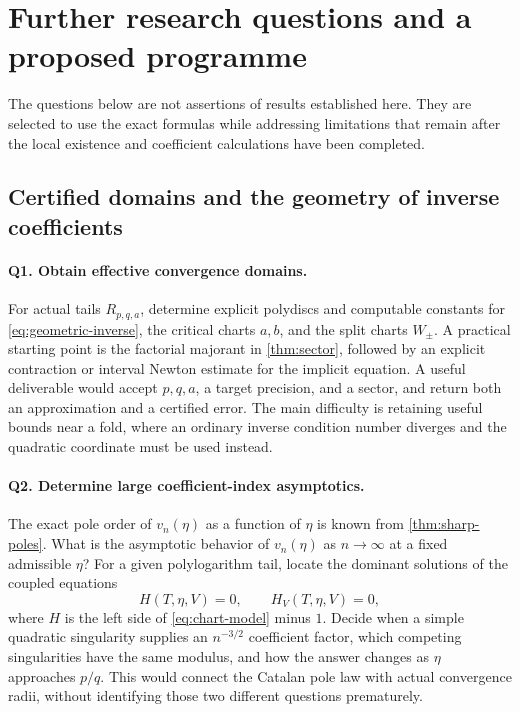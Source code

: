 \documentclass[11pt,a4paper]{article}
\numberwithin{equation}{section}
\theoremstyle{definition}
\theoremstyle{remark}
\begin{document}
\section{Further research questions and a proposed programme}
\label{sec:questions}

The questions below are not assertions of results established here.
They are selected to use the exact formulas while addressing
limitations that remain after the local existence and coefficient
calculations have been completed.

\subsection{Certified domains and the geometry of inverse coefficients}

\paragraph{Q1. Obtain effective convergence domains.}
For actual tails $R_{p,q,a}$, determine explicit polydiscs and
computable constants for \eqref{eq:geometric-inverse}, the critical
charts $a,b$, and the split charts $W_\pm$. A practical starting
point is the factorial majorant in \cref{thm:sector}, followed by
an explicit contraction or interval Newton estimate for the
implicit equation. A useful deliverable would accept $p,q,a$,
a target precision, and a sector, and return both an approximation
and a certified error. The main difficulty is retaining useful
bounds near a fold, where an ordinary inverse condition number
diverges and the quadratic coordinate must be used instead.

\paragraph{Q2. Determine large coefficient-index asymptotics.}
The exact pole order of $v_n(\eta)$ as a function of $\eta$ is known
from \cref{thm:sharp-poles}. What is the asymptotic behavior of
$v_n(\eta)$ as $n\to\infty$ at a fixed admissible $\eta$?
For a given polylogarithm tail, locate the dominant solutions of
the coupled equations
\[
 H(T,\eta,V)=0,\qquad H_V(T,\eta,V)=0,
\]
where $H$ is the left side of \eqref{eq:chart-model} minus $1$.
Decide when a simple quadratic singularity supplies an
$n^{-3/2}$ coefficient factor, which competing singularities have
the same modulus, and how the answer changes as $\eta$ approaches
$p/q$. This would connect the Catalan pole law with actual
convergence radii, without identifying those two different questions
prematurely.
\end{document}
